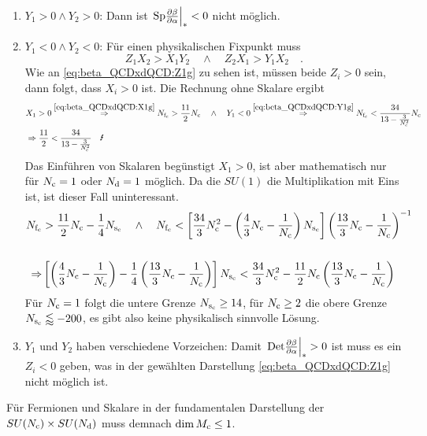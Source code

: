       \begin{enumerate}
      \item $Y_1>0 \land Y_2>0$: Dann ist $\left.\text{Sp} \frac{\partial \beta}{\partial \alpha}\right|_*<0$ nicht 
	möglich.
      \item $Y_1<0 \land Y_2<0$: Für einen physikalischen Fixpunkt 
	muss 
	\begin{equation}
	 Z_1 X_2 > X_1 Y_2 \quad \land \quad Z_2 X_1 > Y_1 X_2 
	 \label{eq:beta_QCDxdQCD:4UV}
	 \quad .
	\end{equation}
	Wie an \eqref{eq:beta_QCDxdQCD:Z1g} zu sehen ist, müssen beide $Z_i>0$ 
	sein, dann folgt, dass $X_i>0$ ist. Die Rechnung ohne Skalare ergibt 
        \begin{align}
	 &X_1>0 \overset{\eqref{eq:beta_QCDxdQCD:X1g}}{\Rightarrow}
	\Nfc>\frac{11}{2}\Nc \quad \land \quad 
	Y_1<0 \overset{\eqref{eq:beta_QCDxdQCD:Y1g}}{\Rightarrow} 
	\Nfc < \frac{34}{13-\frac{3}{\Nc^2}} \Nc \\
	 &\Rightarrow \frac{11}{2}  < \frac{34}{13-\frac{3}{\Nc^2}} \quad 
	 \blitz
	\end{align}
	Das Einführen von Skalaren begünstigt $X_1 > 0$, ist aber mathematisch 
	nur für $N_\text{c}=1$ oder $N_\text{d} =1$ möglich. Da die $SU(1)$ die 
	Multiplikation mit Eins ist, 
        ist dieser Fall uninteressant.
        \begin{align}
	 N_{\text{f}_\text{c}} &> \frac{11}{2} N_\text{c} -\frac{1}{4} N_{\text{s}_\text{c}} \quad \land \quad
	 N_{\text{f}_\text{c}} < \left[ \frac{34}{3} N_\text{c}^2 -\left(\frac43 N_\text{c} -\frac{1}{N_\text{c}}
	  \right) N_{\text{s}_\text{c}} \right] \left( \frac{13}{3}N_\text{c} -\frac{1}{N_\text{c}} 
	  \right)^{-1} \\ \notag\\
	  \Rightarrow & \left[ \left(\frac43 N_\text{c} -\frac{1}{N_\text{c}}\right)
	   -\frac14 \left( \frac{13}{3}N_\text{c} -\frac{1}{N_\text{c}}\right)\right] N_{\text{s}_\text{c}} <
	   \frac{34}{3} N_\text{c}^2 -\frac{11}{2}N_\text{c} \left( \frac{13}{3} N_\text{c}-
	   \frac{1}{N_\text{c}} \right)
	\end{align}
	Für $N_\text{c} = 1$ folgt die untere Grenze $N_{\text{s}_\text{c}} \geq 14$, für $N_\text{c}\geq 2$ 
	die obere Grenze $N_{\text{s}_\text{c}} \lessapprox -200$, es gibt also keine 
	physikalisch sinnvolle Lösung. 
      \item $Y_1$ und $Y_2$ haben verschiedene Vorzeichen: Damit 
      $\left.\text{Det} \frac{\partial \beta}{\partial \alpha}\right|_*>0$ ist muss es ein $Z_i<0$ geben, was in der 
      gewählten Darstellung \eqref{eq:beta_QCDxdQCD:Z1g} nicht 
      möglich ist.
      \end{enumerate}
      
      Für Fermionen und Skalare in der fundamentalen Darstellung der 
      $SU(N_\text{c})\times SU(N_\text{d})$ muss demnach $\dim M_\text{c} \leq 1 $.
      
